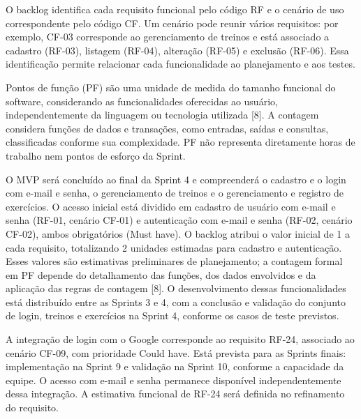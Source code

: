 O backlog identifica cada requisito funcional pelo código RF e o cenário de uso correspondente pelo código CF. Um cenário pode reunir vários requisitos: por exemplo, CF-03 corresponde ao gerenciamento de treinos e está associado a cadastro (RF-03), listagem (RF-04), alteração (RF-05) e exclusão (RF-06). Essa identificação permite relacionar cada funcionalidade ao planejamento e aos testes.

Pontos de função (PF) são uma unidade de medida do tamanho funcional do software, considerando as funcionalidades oferecidas ao usuário, independentemente da linguagem ou tecnologia utilizada [8]. A contagem considera funções de dados e transações, como entradas, saídas e consultas, classificadas conforme sua complexidade. PF não representa diretamente horas de trabalho nem pontos de esforço da Sprint.

O MVP será concluído ao final da Sprint 4 e compreenderá o cadastro e o login com e-mail e senha, o gerenciamento de treinos e o gerenciamento e registro de exercícios. O acesso inicial está dividido em cadastro de usuário com e-mail e senha (RF-01, cenário CF-01) e autenticação com e-mail e senha (RF-02, cenário CF-02), ambos obrigatórios (Must have). O backlog atribui o valor inicial de 1 a cada requisito, totalizando 2 unidades estimadas para cadastro e autenticação. Esses valores são estimativas preliminares de planejamento; a contagem formal em PF depende do detalhamento das funções, dos dados envolvidos e da aplicação das regras de contagem [8]. O desenvolvimento dessas funcionalidades está distribuído entre as Sprints 3 e 4, com a conclusão e validação do conjunto de login, treinos e exercícios na Sprint 4, conforme os casos de teste previstos.

A integração de login com o Google corresponde ao requisito RF-24, associado ao cenário CF-09, com prioridade Could have. Está prevista para as Sprints finais: implementação na Sprint 9 e validação na Sprint 10, conforme a capacidade da equipe. O acesso com e-mail e senha permanece disponível independentemente dessa integração. A estimativa funcional de RF-24 será definida no refinamento do requisito.

